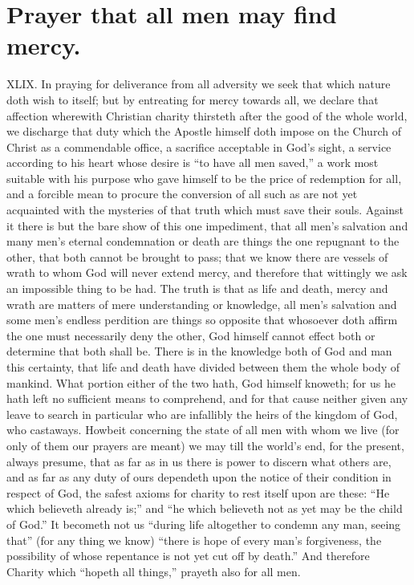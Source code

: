 \section*{Prayer that all men may find mercy.}
XLIX. In praying for deliverance from all adversity we seek that which nature doth wish to itself; but by entreating for mercy towards all, we declare that affection wherewith Christian charity thirsteth after the good of the whole world, we discharge that duty which the Apostle himself doth impose on the Church of Christ as a commendable office, a sacrifice acceptable in God’s sight, a service according to his heart whose desire is “to have all men saved,” a work most suitable with his purpose who gave himself to be the price of  redemption for all, and a forcible mean to procure the conversion of all such as are not yet acquainted with the mysteries of that truth which must save their souls. Against it there is but the bare show of this one impediment, that all men’s salvation and many men’s eternal condemnation or death are things the one repugnant to the other, that both cannot be brought to pass; that we know there are vessels of wrath to whom God will never extend mercy, and therefore that wittingly we ask an impossible thing to be had.
The truth is that as life and death, mercy and wrath are matters of mere understanding or knowledge, all men’s salvation and some men’s endless perdition are things so opposite that whosoever doth affirm the one must necessarily deny the other, God himself cannot effect both or determine that both shall be. There is in the knowledge both of God and man this certainty, that life and death have divided between them the whole body of mankind. What portion either of the two hath, God himself knoweth; for us he hath left no sufficient means to comprehend, and for that cause neither given any leave to search in particular who are infallibly the heirs of the kingdom of God, who castaways. Howbeit concerning the state of all men with whom we live (for only of them our prayers are meant) we may till the world’s end, for the present, always presume, that as far as in us there is power to discern what others are, and as far as any duty of ours dependeth upon the notice of their condition in respect of God, the safest axioms for charity to rest itself upon are these: “He which believeth already is;” and “he which believeth not as yet may be the child of God.” It becometh not us “during life altogether to condemn any man, seeing that” (for any thing we know) “there is hope of every man’s forgiveness, the possibility of whose repentance is  not yet cut off by death.” And therefore Charity which “hopeth all things,” prayeth also for all men.

